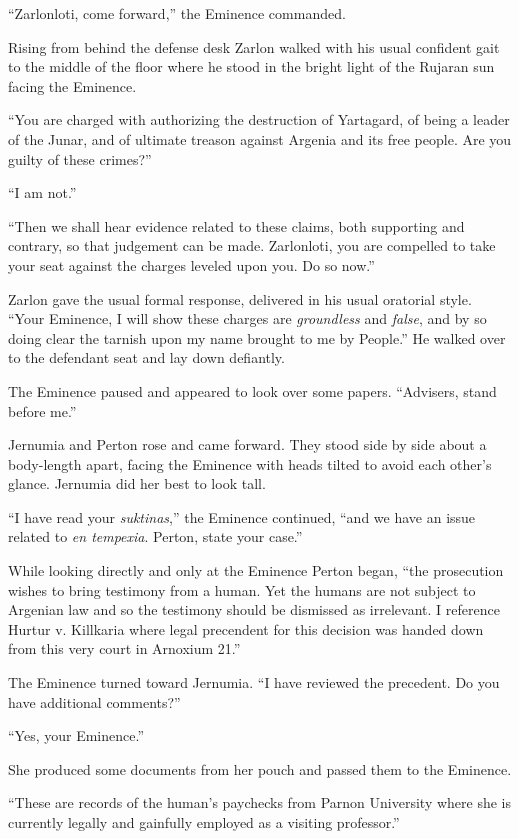 ``Zarlonloti, come forward,'' the Eminence commanded.

Rising from behind the defense desk Zarlon walked with his usual confident gait to the middle of
the floor where he stood in the bright light of the Rujaran sun facing the Eminence.

``You are charged with authorizing the destruction of Yartagard, of being a leader of the Junar,
and of ultimate treason against Argenia and its free people. Are you guilty of these crimes?''

``I am not.''

``Then we shall hear evidence related to these claims, both supporting and contrary, so that
judgement can be made. Zarlonloti, you are compelled to take your seat against the charges
leveled upon you. Do so now.''

Zarlon gave the usual formal response, delivered in his usual oratorial style. ``Your Eminence,
I will show these charges are \emph{groundless} and \emph{false}, and by so doing clear the
tarnish upon my name brought to me by People.'' He walked over to the defendant seat and lay
down defiantly.

The Eminence paused and appeared to look over some papers. ``Advisers, stand before me.''

Jernumia and Perton rose and came forward. They stood side by side about a body-length apart,
facing the Eminence with heads tilted to avoid each other's glance. Jernumia did her best to
look tall.

``I have read your \textit{suktinas},'' the Eminence continued, ``and we have an issue related
to \textit{en tempexia}. Perton, state your case.''

While looking directly and only at the Eminence Perton began, ``the prosecution wishes to bring
testimony from a human. Yet the humans are not subject to Argenian law and so the testimony
should be dismissed as irrelevant. I reference Hurtur v. Killkaria where legal precendent for
this decision was handed down from this very court in Arnoxium 21.''

The Eminence turned toward Jernumia. ``I have reviewed the precedent. Do you have additional
comments?''

``Yes, your Eminence.''

She produced some documents from her pouch and passed them to the Eminence.

``These are records of the human's paychecks from Parnon University where she is currently
legally and gainfully employed as a visiting professor.''

